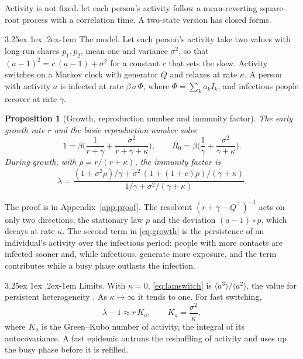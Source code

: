 \documentclass[11pt]{article}
\makeatletter
\renewcommand\paragraph{\@startsection{paragraph}{4}{\z@}%
  {3.25ex \@plus1ex \@minus.2ex}{-1em}%
  {\normalfont\normalsize\itshape}}
\newtheorem{proposition}{Proposition}
\theoremstyle{remark}
\makeatother
\begin{document}
Activity is not fixed. \citet{tkachenko2021elife} let each person's activity follow a mean-reverting square-root
process with a correlation time. A two-state version has closed forms.

\paragraph{The model.} Let each person's activity take two values with long-run shares $p_1, p_2$, mean one and
variance $\sigma^2$, so that $(a - 1)^2 = c\,(a - 1) + \sigma^2$ for a constant $c$ that sets the skew. Activity
switches on a Markov clock with generator $Q$ and relaxes at rate $\kappa$. A person with activity $a$ is infected at
rate $\beta\,a\,\Phi$, where $\Phi = \sum_k a_k I_k$, and infectious people recover at rate $\gamma$.

\begin{proposition}[Growth, reproduction number and immunity factor]\label{prop:switch}
The early growth rate $r$ and the basic reproduction number solve
\begin{equation}\label{eq:growth}
  1 = \beta\Big(\frac{1}{r + \gamma} + \frac{\sigma^2}{r + \gamma + \kappa}\Big), \qquad
  R_0 = \beta\Big(\frac1\gamma + \frac{\sigma^2}{\gamma + \kappa}\Big).
\end{equation}
During growth, with $\rho = r/(r + \kappa)$, the immunity factor is
\begin{equation}\label{eq:lamswitch}
  \lambda = \frac{(1 + \sigma^2\rho)/\gamma + \sigma^2\,(1 + (1 + c)\rho)/(\gamma + \kappa)}{1/\gamma + \sigma^2/(\gamma + \kappa)} .
\end{equation}
\end{proposition}

The proof is in Appendix~\ref{app:proof}. The resolvent $(r + \gamma - Q^\top)^{-1}$ acts on only two directions,
the stationary law $p$ and the deviation $(a - 1)\circ p$, which decays at rate $\kappa$. The second term in
\eqref{eq:growth} is the persistence of an individual's activity over the infectious period: people with more
contacts are infected sooner and, while infectious, generate more exposure, and the term contributes while a busy
phase outlasts the infection.

\paragraph{Limits.} With $\kappa = 0$, \eqref{eq:lamswitch} is $\langle a^3\rangle/\langle a^2\rangle$, the value for
persistent heterogeneity \citep[eqs.~12, 18]{tkachenko2021}. As $\kappa \to \infty$ it tends to one. For fast switching,
\begin{equation}\label{eq:gk}
  \lambda - 1 \approx r\,K_a, \qquad K_a = \frac{\sigma^2}{\kappa},
\end{equation}
where $K_a$ is the Green--Kubo number of activity, the integral of its autocovariance. A fast epidemic outruns the
reshuffling of activity and uses up the busy phase before it is refilled.
\end{document}
